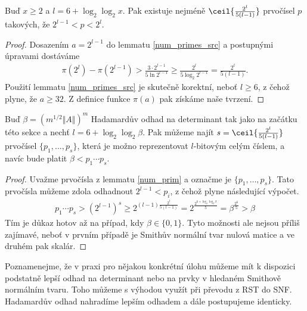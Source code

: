 \begin{lem} \label{num_prim}
Buď $ x \geq 2 $ a $ l = 6 + \log_2 \log_2 x $.
Pak existuje nejméně $ \ceil{\frac{2^{l}}{5 (l - 1)}} $ prvočísel $ p $
takových, že $ 2^{l - 1} < p < 2^l $.
\end{lem}
\begin{proof}
Dosazením $ a = 2^{l - 1} $ do lemmatu \ref{num_primes_src} a postupnými úpravami
dostáváme
\begin{align*}
    \pi(2^{l}) - \pi(2^{l - 1}) > \frac{3 \cdot 2^{l - 1}}{5 \ln{2^{l - 1}}}
                                \geq \frac{2^{l}}{5 \log_2{2^{l - 1}}}
                                = \frac{2^{l}}{5 (l - 1)}.
\end{align*}
Použití lemmatu \ref{num_primes_src} je skutečně korektní, neboť
$ l \geq 6 $, z čehož plyne, že $ a \geq 32 $. Z definice funkce $ \pi(a) $ pak
získáme naše tvrzení.
\end{proof}
\begin{dus}
Buď $ \beta = (m^{1/2} \Vert A \Vert )^m $ Hadamardův odhad na determinant tak
jako na začátku této sekce a nechť $ l = 6 + \log_2 \log_2 \beta $. Pak můžeme najít
$ s = \ceil{\frac{2^{l}}{5 (l - 1)}} $ prvočísel $ \{p_1, \dots, p_s\} $,
která je možno reprezentovat $ l $-bitovým celým číslem, a navíc bude platit
$ \beta < p_1 \cdots p_s $.
\end{dus}
\begin{proof}
Uvažme prvočísla z lemmatu \ref{num_prim} a označme je $ \{p_1, \dots, p_s\} $.
Tato prvočísla můžeme zdola odhadnout $ 2^{l - 1} < p_i $,
z čehož plyne následující výpočet.
\begin{align*}
    p_1 \cdots p_s
        > (2^{l - 1}) ^ s
        \geq 2^{(l - 1) \frac{2^l}{5 (l - 1)}}
        = 2^{\frac{2^{6 + \log_2 \log_2 \beta}}{5}}
        = \beta^{\frac{2^6}{5}} > \beta
\end{align*}
Tím je důkaz hotov až na případ, kdy $ \beta \in \{0, 1\} $. Tyto možnosti ale
nejsou příliš zajímavé, neboť v prvním případě je Smithův normální tvar nulová
matice a ve druhém pak skalár.
\end{proof}

\begin{pozn}
Poznamenejme, že v praxi pro nějakou konkrétní úlohu můžeme mít k dispozici
podstatně lepší odhad na determinant nebo na prvky v hledaném Smithově normálním
tvaru. Toho můžeme s výhodou využít při převodu z RST do SNF. Hadamardův odhad
nahradíme lepším odhadem a dále postupujeme identicky.
\end{pozn}

